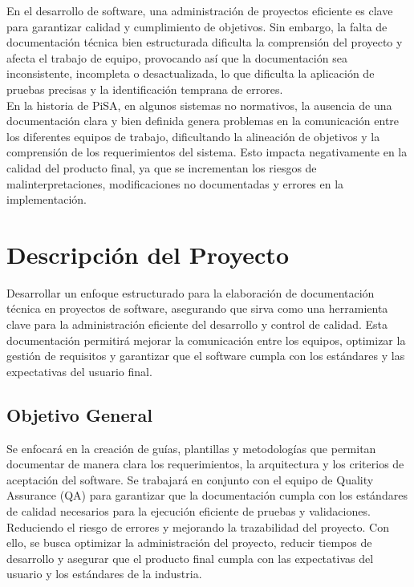 \documentclass[12pt,letterpaper,spanish, xcolor=table]{report}
\numberwithin{figure}{subsection}
\begin{document}
	En el desarrollo de software, una administración de proyectos eficiente es clave para garantizar calidad y cumplimiento de objetivos. Sin embargo, la falta de documentación técnica bien estructurada dificulta la comprensión del proyecto y afecta el trabajo de equipo, provocando así que la documentación sea inconsistente, incompleta o desactualizada, lo que dificulta la aplicación de pruebas precisas y la identificación temprana de errores.  \\
	
	En la historia de PiSA, en algunos sistemas no normativos, la ausencia de una documentación clara y bien definida genera problemas en la comunicación entre los diferentes equipos de trabajo, dificultando la alineación de objetivos y la comprensión de los requerimientos del sistema. Esto impacta negativamente en la calidad del producto final, ya que se incrementan los riesgos de malinterpretaciones, modificaciones no documentadas y errores en la implementación.
	

\section{Descripción del Proyecto}
	
	Desarrollar un enfoque estructurado para la elaboración de documentación técnica en proyectos de software, asegurando que sirva como una herramienta clave para la administración eficiente del desarrollo y control de calidad. Esta documentación permitirá mejorar la comunicación entre los equipos, optimizar la gestión de requisitos y garantizar que el software cumpla con los estándares y las expectativas del usuario final.


\subsection{Objetivo General}

	Se enfocará en la creación de guías, plantillas y metodologías que permitan documentar de manera clara los requerimientos, la arquitectura y los criterios de aceptación del software. Se trabajará en conjunto con el equipo de Quality Assurance (QA) para garantizar que la documentación cumpla con los estándares de calidad necesarios para la ejecución eficiente de pruebas y validaciones. Reduciendo el riesgo de errores y mejorando la trazabilidad del proyecto. Con ello, se busca optimizar la administración del proyecto, reducir tiempos de desarrollo y asegurar que el producto final cumpla con las expectativas del usuario y los estándares de la industria.\\
	
\end{document}

